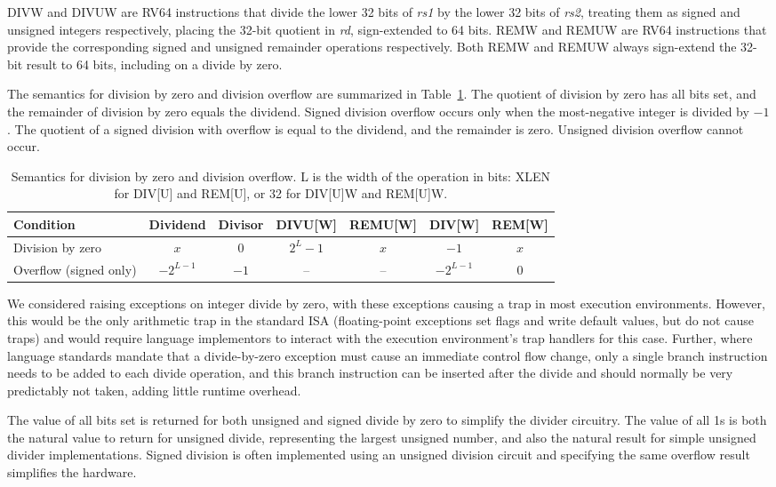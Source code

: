 DIVW and DIVUW are RV64 instructions that divide the
lower 32 bits of {\em rs1} by the lower 32 bits of {\em rs2}, treating
them as signed and unsigned integers respectively, placing the 32-bit
quotient in {\em rd}, sign-extended to 64 bits.  REMW and REMUW
are RV64 instructions that provide the corresponding
signed and unsigned remainder operations respectively. Both REMW and
REMUW always sign-extend the 32-bit result to 64 bits, including on a
divide by zero.

The semantics for division by zero and division overflow are summarized in
Table~\ref{tab:divby0}.  The quotient of division by zero has all bits set, and
the remainder of division by zero equals the dividend.  Signed division overflow
occurs only when the most-negative integer is divided by $-1$.  The quotient of
a signed division with overflow is equal to the dividend, and the remainder is
zero. Unsigned division overflow cannot occur.

\vspace{0.1in}
\begin{table}[h]
\center
\begin{tabular}{|l|c|c||c|c|c|c|}
\hline
Condition              & Dividend   & Divisor & DIVU[W]   & REMU[W] & DIV[W]     & REM[W] \\ \hline
Division by zero       & $x$        & 0       & $2^{L}-1$ & $x$     & $-1$       & $x$    \\
Overflow (signed only) & $-2^{L-1}$ & $-1$    & --        & --      & $-2^{L-1}$ & 0      \\
\hline
\end{tabular}
\caption{Semantics for division by zero and division overflow.
L is the width of the operation in bits: XLEN for DIV[U] and REM[U], or
32 for DIV[U]W and REM[U]W.}
\label{tab:divby0}
\end{table}

\begin{commentary}
We considered raising exceptions on integer divide by zero, with these
exceptions causing a trap in most execution environments.  However,
this would be the only arithmetic trap in the standard ISA
(floating-point exceptions set flags and write default values, but do
not cause traps) and would require language implementors to interact
with the execution environment's trap handlers for this case.
Further, where language standards mandate that a divide-by-zero
exception must cause an immediate control flow change, only a single
branch instruction needs to be added to each divide operation, and
this branch instruction can be inserted after the divide and should
normally be very predictably not taken, adding little runtime
overhead.

The value of all bits set is returned for both unsigned and signed
divide by zero to simplify the divider circuitry.  The value of all 1s
is both the natural value to return for unsigned divide, representing
the largest unsigned number, and also the natural result for simple
unsigned divider implementations.  Signed division is often
implemented using an unsigned division circuit and specifying the same
overflow result simplifies the hardware.
\end{commentary}

